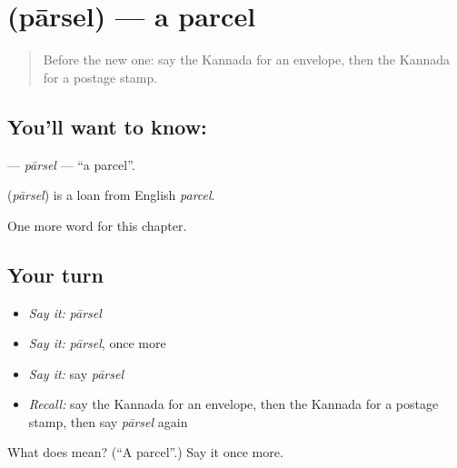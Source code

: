 \section[\texorpdfstring{\kn{ಪಾರ್ಸೆಲ್} (pārsel)}{ಪಾರ್ಸೆಲ್ (pārsel)}]{ (pārsel) — a parcel}

\label{lesson:KA-C295-parsel}



\begin{quote}
Before the new one: say the Kannada for an envelope, then the Kannada for a postage stamp.
\end{quote}

\subsection*{You'll want to know: }
\textbf{} — \emph{pārsel} — \textquotedblleft{}a parcel\textquotedblright{}.

\begin{cousinweb}
\textbf{} (\emph{pārsel}) is a loan from English \emph{parcel}.
\end{cousinweb}

\begin{grammarlens}[title={What you've built}]
One more word for this chapter.
\end{grammarlens}

\subsection*{Your turn}
\begin{itemize}
\raggedright
  \item \emph{Say it:} \emph{pārsel}
  \item \emph{Say it:} \emph{pārsel}, once more
  \item \emph{Say it:} say \emph{pārsel}
  \item \emph{Recall:} say the Kannada for an envelope, then the Kannada for a postage stamp, then say \emph{pārsel} again
\end{itemize}

\begin{tcolorbox}[breakable,colback=teal!4,colframe=teal!35!black,title={Before you move on}]
What does  mean? (\textquotedblleft{}A parcel\textquotedblright{}.) Say it once more.
\end{tcolorbox}
